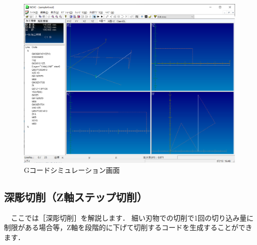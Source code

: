 \begin{figure}[H]
\centering
\includegraphics[scale=0.55]{No3/fig/sample4.png}
\caption{Gコードシミュレーション画面}
\label{fig:sample4.png}
\end{figure}

\subsection{深彫切削（Z軸ステップ切削）}
　ここでは［深彫切削］を解説します．
細い刃物での切削で1回の切り込み量に制限がある場合等，Z軸を段階的に下げて切削するコードを生成することができます．

